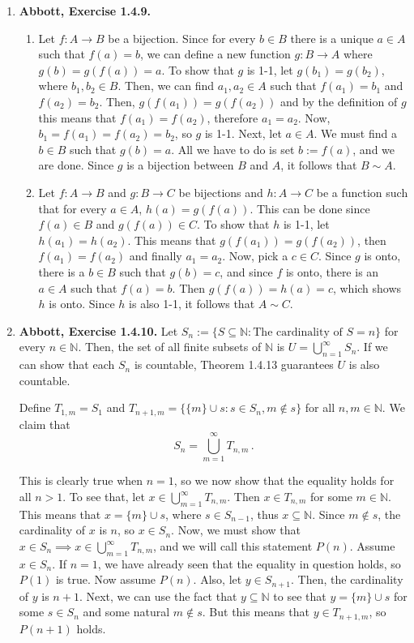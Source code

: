 \documentclass{article}
\newcommand{\N}{\mathbb{N}}
\newcommand{\exc}[2][Abbott]{\item \textbf{#1, Exercise #2.}}
\begin{document}
\begin{enumerate}
	\exc{1.4.9}
				      	          
	\begin{enumerate}
		\item Let $f : A \rightarrow B$ be a bijection. Since for every $b \in B$ there is a unique $a \in A$ such that $f(a) = b$, we can define a new function $g: B \rightarrow A$ where $g(b) = g(f(a)) = a$. To show that $g$ is 1-1, let $g(b_1) = g(b_2)$, where $b_1,b_2 \in B$. Then, we can find $a_1, a_2 \in A$ such that $f(a_1) = b_1$ and $f(a_2) = b_2$. Then, $g(f(a_1)) = g(f(a_2))$ and by the definition of $g$ this means that $f(a_1) = f(a_2)$, therefore $a_1 = a_2$. Now, $b_1 = f(a_1) = f(a_2) = b_2$, so $g$ is 1-1. Next, let $a \in A$. We must find a $b \in B$ such that $g(b) = a$. All we have to do is set $b := f(a)$, and we are done. Since $g$ is a bijection between $B$ and $A$, it follows that $B \sim A$.
		      		      		      	      	      	      	              
		\item Let $f : A \rightarrow B$ and $g : B \rightarrow C$ be bijections and $h : A \rightarrow C$ be a function such that for every $a \in A$, $h(a) = g(f(a))$. This can be done since $f(a) \in B$ and $g(f(a)) \in C$. To show that $h$ is 1-1, let $h(a_1) = h(a_2)$. This means that $g(f(a_1)) = g(f(a_2))$, then $f(a_1) = f(a_2)$ and finally $a_1 = a_2$. Now, pick a $c \in C$.  Since $g$ is onto, there is a $b \in B$ such that $g(b) = c$, and since $f$ is onto, there is an $a \in A$ such that $f(a)=b$. Then $g(f(a)) = h(a) = c$, which shows $h$ is onto. Since $h$ is also 1-1, it follows that $A \sim C$.
	\end{enumerate}
				      	          
	\exc{1.4.10}
	Let $S_n := \{S \subseteq \N : \text{The cardinality of } S = n\}$ for every $n \in \N$. Then, the set of all finite subsets of $\N$ is $U = \bigcup_{n=1}^\infty S_n$. If we can show that each $S_n$ is countable, Theorem 1.4.13 guarantees $U$ is also countable.
				      	          
	Define $T_{1,m} = S_1$ and $T_{n+1,m} = \{\{m\} \cup s : s \in S_n, m \notin s\}$ for all $n, m \in \N$. We claim that \begin{equation*}
	S_n = \bigcup_{m=1}^{\infty} T_{n,m} \, .
	\end{equation*}
					    
	This is clearly true when $n = 1$, so we now show that the equality holds for all $n > 1$. To see that, let $x \in \bigcup_{m=1}^{\infty} T_{n,m}$. Then $x \in T_{n, m}$ for some $m \in \N$. This means that $x = \{m\} \cup s$, where $s \in S_{n-1}$, thus $x \subseteq \N$. Since $m \notin s$, the cardinality of $x$ is $n$, so $x \in S_n$. Now, we must show that $x \in S_n \implies x \in \bigcup_{m=1}^{\infty} T_{n,m}$, and we will call this statement $P(n)$. Assume $x \in S_n$. If $n = 1$, we have already seen that the equality in question holds, so $P(1)$ is true. Now assume $P(n)$. Also, let $y \in S_{n+1}$. Then, the cardinality of $y$ is $n+1$. Next, we can use the fact that $y \subseteq \N$ to see that $y = \{m\} \cup s$ for some $s \in S_n$ and some natural $m \notin s$. But this means that $y \in T_{n+1, m}$, so $P(n+1)$ holds.
					    

\end{enumerate}
\end{document}
